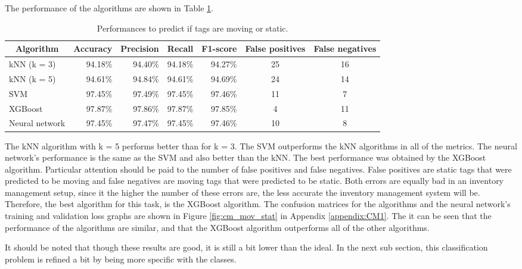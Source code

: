 \documentclass{article}
\begin{document}
The performance of the algorithms are shown in Table \ref{tab:Mov_stat_clas}.
%
\begin{table}[h!]
\centering
\setlength{\belowcaptionskip}{7pt}
\caption{Performances to predict if tags are moving or static.}
\label{tab:Mov_stat_clas}
\begin{tabular}{@{}lrrrrcc@{}}
\toprule
\multicolumn{1}{c}{\textbf{Algorithm}} & \multicolumn{1}{c}{\textbf{Accuracy}} & \multicolumn{1}{c}{\textbf{Precision}} & \multicolumn{1}{c}{\textbf{Recall}} & \multicolumn{1}{c}{\textbf{F1-score}} & \multicolumn{1}{c}{\textbf{False positives}} & \multicolumn{1}{c}{\textbf{False negatives}}\\ \midrule
kNN (k = 3)    & 94.18\%   & 94.40\%   & 94.18\%   & 94.27\%   & 25   & 16  \\
kNN (k = 5)    & 94.61\%   & 94.84\%   & 94.61\%   & 94.69\%   & 24   & 14  \\
SVM            & 97.45\%   & 97.49\%   & 97.45\%   & 97.46\%   & 11   & 7 \\
XGBoost        & 97.87\%   & 97.86\%   & 97.87\%   & 97.85\%   & 4    & 11  \\
Neural network & 97.45\%   & 97.47\%   & 97.45\%   & 97.46\%   & 10   & 8 \\ \bottomrule
\end{tabular}
\end{table}
%
The \ac{kNN} algorithm with k = 5 performs better than for k = 3.
The \ac{SVM} outperforms the \ac{kNN} algorithms in all of the metrics.
The neural network's performance is the same as the \ac{SVM} and also better than the \ac{kNN}.
The best performance was obtained by the XGBoost algorithm.
Particular attention should be paid to the number of false positives and false negatives. 
False positives are static tags that were predicted to be moving and false negatives are moving tags that were predicted to be static.
Both errors are equally bad in an inventory management setup, since it the higher the number of these errors are, the less accurate the inventory management system will be.
Therefore, the best algorithm for this task, is the XGBoost algorithm.
The confusion matrices for the algorithms and the neural network's training and validation loss graphs are shown in Figure \ref{fig:cm_mov_stat} in Appendix \ref{appendix:CM1}.
The it can be seen that the performance of the algorithms are similar, and that the XGBoost algorithm outperforms all of the other algorithms.

It should be noted that though these results are good, it is still a bit lower than the ideal.
In the next sub section, this classification problem is refined a bit by being more specific with the classes.
\end{document}
